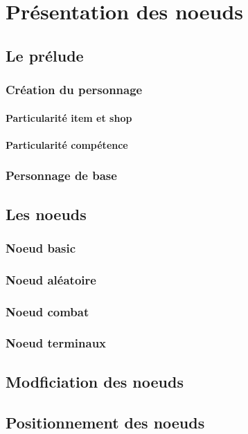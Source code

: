 \chapter{Présentation des noeuds}

	\section{Le prélude}

		\subsection{Création du personnage}

			\subsubsection{Particularité item et shop}

			\subsubsection{Particularité compétence}

		\subsection{Personnage de base}

	\section{Les noeuds}

		\subsection{Noeud basic}

		\subsection{Noeud aléatoire}

		\subsection{Noeud combat}

		\subsection{Noeud terminaux}

	\section{Modficiation des noeuds}

	\section{Positionnement des noeuds}
